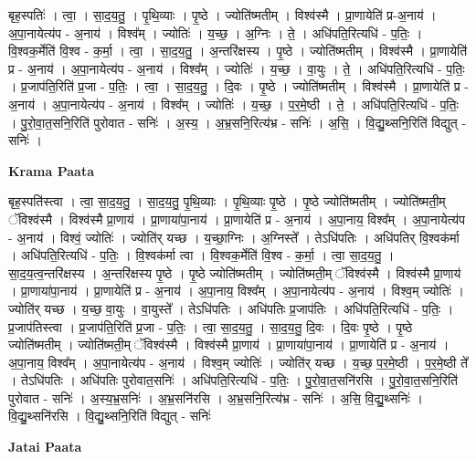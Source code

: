 \documentclass[17pt]{extarticle}
\begin{document}
बृह॒स्पतिः॑ । त्वा॒ । सा॒द॒य॒तु॒ । पृ॒थि॒व्याः । पृ॒ष्ठे । ज्योति॑ष्मतीम् । विश्व॑स्मै । प्रा॒णायेति॑ प्र-अ॒नाय॑ । अ॒पा॒नायेत्य॑प - अ॒नाय॑ । विश्व᳚म् । ज्योतिः॑ । य॒च्छ॒ । अ॒ग्निः । ते॒ । अधि॑पति॒रित्यधि॑ - प॒तिः॒ । वि॒श्वक॒र्मेति॑ वि॒श्व - क॒र्मा॒ । त्वा॒ । सा॒द॒य॒तु॒ । अ॒न्तरि॑क्षस्य । पृ॒ष्ठे । ज्योति॑ष्मतीम् । विश्व॑स्मै । प्रा॒णायेति॑ प्र - अ॒नाय॑ । अ॒पा॒नायेत्य॑प - अ॒नाय॑ । विश्व᳚म् । ज्योतिः॑ । य॒च्छ॒ । वा॒युः । ते॒ । अधि॑पति॒रित्यधि॑ - प॒तिः॒ । प्र॒जाप॑ति॒रिति॑ प्र॒जा - प॒तिः॒ । त्वा॒ । सा॒द॒य॒तु॒ । दि॒वः । पृ॒ष्ठे । ज्योति॑ष्मतीम् । विश्व॑स्मै । प्रा॒णायेति॑ प्र - अ॒नाय॑ । अ॒पा॒नायेत्य॑प - अ॒नाय॑ । विश्व᳚म् । ज्योतिः॑ । य॒च्छ॒ । प॒र॒मे॒ष्ठी । ते॒ । अधि॑पति॒रित्यधि॑ - प॒तिः॒ । पु॒रो॒वा॒त॒सनि॒रिति॑ पुरोवात - सनिः॑ । अ॒स्य॒ । अ॒भ्र॒सनि॒रित्य॑भ्र - सनिः॑ । अ॒सि॒ । वि॒द्यु॒थ्सनि॒रिति॑ विद्युत् - सनिः॑ ।  \newline


\textbf{Krama Paata} \newline

बृह॒स्पति॑स्त्वा । त्वा॒ सा॒द॒य॒तु॒ । सा॒द॒य॒तु॒ पृ॒थि॒व्याः । पृ॒थि॒व्याः पृ॒ष्ठे । पृ॒ष्ठे ज्योति॑ष्मतीम् । ज्योति॑ष्मती॒म् ॅविश्व॑स्मै । विश्व॑स्मै प्रा॒णाय॑ । प्रा॒णाया॑पा॒नाय॑ । प्रा॒णायेति॑ प्र - अ॒नाय॑ । अ॒पा॒नाय॒ विश्व᳚म् । अ॒पा॒नायेत्य॑प - अ॒नाय॑ । विश्वं॒ ज्योतिः॑ । ज्योति॑र् यच्छ । य॒च्छा॒ग्निः । अ॒ग्निस्ते᳚ । तेऽधि॑पतिः । अधि॑पतिर् वि॒श्वक॑र्मा । अधि॑पति॒रित्यधि॑ - प॒तिः॒ । वि॒श्वक॑र्मा त्वा । वि॒श्वक॒र्मेति॑ वि॒श्व - क॒र्मा॒ । त्वा॒ सा॒द॒य॒तु॒ । सा॒द॒य॒त्व॒न्तरि॑क्षस्य । अ॒न्तरि॑क्षस्य पृ॒ष्ठे । पृ॒ष्ठे ज्योति॑ष्मतीम् । ज्योति॑ष्मती॒म् ॅविश्व॑स्मै । विश्व॑स्मै प्रा॒णाय॑ । प्रा॒णाया॑पा॒नाय॑ । प्रा॒णायेति॑ प्र - अ॒नाय॑ । अ॒पा॒नाय॒ विश्व᳚म् । अ॒पा॒नायेत्य॑प - अ॒नाय॑ । विश्व॒म् ज्योतिः॑ । ज्योति॑र् यच्छ । य॒च्छ॒ वा॒युः । वा॒युस्ते᳚ । तेऽधि॑पतिः । अधि॑पतिः प्र॒जाप॑तिः । अधि॑पति॒रित्यधि॑ - प॒तिः॒ । प्र॒जाप॑तिस्त्वा । प्र॒जाप॑ति॒रिति॑ प्र॒जा - प॒तिः॒ । त्वा॒ सा॒द॒य॒तु॒ । सा॒द॒य॒तु॒ दि॒वः । दि॒वः पृ॒ष्ठे । पृ॒ष्ठे ज्योति॑ष्मतीम् । ज्योति॑ष्मती॒म् ॅविश्व॑स्मै । विश्व॑स्मै प्रा॒णाय॑ । प्रा॒णाया॑पा॒नाय॑ । प्रा॒णायेति॑ प्र - अ॒नाय॑ । अ॒पा॒नाय॒ विश्व᳚म् । अ॒पा॒नायेत्य॑प - अ॒नाय॑ । विश्व॒म् ज्योतिः॑ । ज्योति॑र् यच्छ । य॒च्छ॒ प॒र॒मे॒ष्ठी । प॒र॒मे॒ष्ठी ते᳚ । तेऽधि॑पतिः । अधि॑पतिः पुरोवात॒सनिः॑ । अधि॑पति॒रित्यधि॑ - प॒तिः॒ । पु॒रो॒वा॒त॒सनि॑रसि । पु॒रो॒वा॒त॒सनि॒रिति॑ पुरोवात - सनिः॑ । अ॒स्य॒भ्र॒सनिः॑ । अ॒भ्र॒सनि॑रसि । अ॒भ्र॒सनि॒रित्य॑भ्र - सनिः॑ । अ॒सि॒ वि॒द्यु॒थ्सनिः॑ । वि॒द्यु॒थ्सनि॑रसि । वि॒द्यु॒थ्सनि॒रिति॑ विद्युत् - सनिः॑ \newline

\textbf{Jatai Paata} \newline
\end{document}
